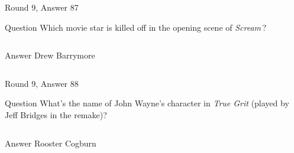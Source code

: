 \documentclass[11pt]{beamer}
\begin{document}
\begin{frame}[t]{Round 9, Answer 87}
  \vspace{2em}
  \begin{block}{Question}
    Which movie star is killed off in the opening scene of \emph{Scream}\,?
  \end{block}
  \pause{}
  \begin{columns}[T,totalwidth=\linewidth]
    \begin{column}{0.35\linewidth}
      \begin{block}{Answer}
        Drew Barrymore
      \end{block}
    \end{column}
    \begin{column}{0.6\linewidth}
      \begin{center}
        \texttt{[image: \{Images/barrymore]}.jpg}
      \end{center}
    \end{column}
  \end{columns}
\end{frame}


\begin{frame}[t]{Round 9, Answer 88}
  \vspace{2em}
  \begin{block}{Question}
    What's the name of John Wayne's character in \emph{True Grit} (played by Jeff Bridges in the remake)?
  \end{block}
  \pause{}
  \begin{columns}[T,totalwidth=\linewidth]
    \begin{column}{0.35\linewidth}
      \begin{block}{Answer}
        Rooster Cogburn
      \end{block}
    \end{column}
    \begin{column}{0.6\linewidth}
      \begin{center}
        \texttt{[image: \{Images/cogburn]}.jpeg}
      \end{center}
    \end{column}
  \end{columns}
\end{frame}
\end{document}
